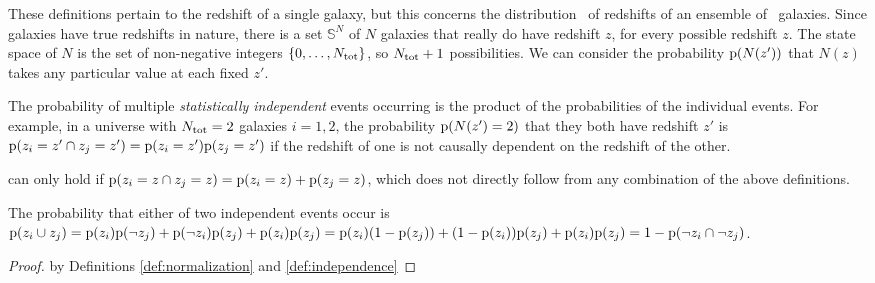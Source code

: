 These definitions pertain to the redshift of a single galaxy, but this \paper concerns the distribution \Nz\ of redshifts of an ensemble of \ntot\ galaxies.
Since galaxies have true redshifts in nature, there is a set $\mathbb{S}^{N}$ of $N$ galaxies that really do have redshift $z$, for every possible redshift $z$.
The state space of $N$ is the set of non-negative integers $\{0, \dots, N_{\mathrm{tot}}\}$, so $N_{\mathrm{tot}} + 1$ possibilities.
We can consider the probability $\mathrm{p}(N(z'))$ that $N(z)$ takes any particular value at each fixed $z'$.

\begin{definition}\label{def:independence}
	The probability of multiple \textit{statistically independent} events occurring is the product of the probabilities of the individual events.
	For example, in a universe with $N_{\mathrm{tot}} = 2$ galaxies $i = 1, 2$, the probability $\mathrm{p}(N(z') = 2)$ that they both have redshift $z'$ is $\mathrm{p}(z_{i} = z' \cap z_{j} = z') = \mathrm{p}(z_{i} = z') \mathrm{p}(z_{j} = z')$ if the redshift of one is not causally dependent on the redshift of the other.
\end{definition}


 can only hold if $\mathrm{p}(z_{i} = z \cap z_{j} = z) = \mathrm{p}(z_{i} = z) + \mathrm{p}(z_{j} = z)$, which does not directly follow from any combination of the above definitions.

\begin{proposition}\label{prp:union}
	The probability that either of two independent events occur is $\mathrm{p}(z_{i} \cup z_{j}) = \mathrm{p}(z_{i}) \mathrm{p}(\lnot z_{j}) + \mathrm{p}(\lnot z_{i}) \mathrm{p}(z_{j}) + \mathrm{p}(z_{i}) \mathrm{p}(z_{j}) = \mathrm{p}(z_{i}) (1 - \mathrm{p}(z_{j})) + (1 - \mathrm{p}(z_{i})) \mathrm{p}(z_{j}) + \mathrm{p}(z_{i}) \mathrm{p}(z_{j}) = 1 - \mathrm{p}(\lnot z_{i} \cap \lnot z_{j})$.
\end{proposition}
\begin{proof}
	by Definitions \ref{def:normalization} and \ref{def:independence}
\end{proof}



